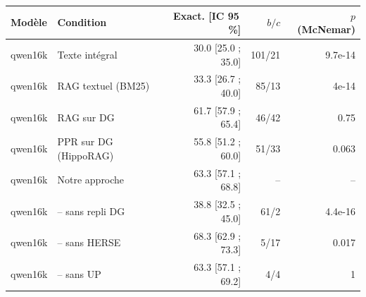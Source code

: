 \begin{tabular}{llrrr}
\hline
Modèle & Condition & Exact. [IC 95\,\%] & $b/c$ & $p$ (McNemar) \\
\hline
qwen16k & Texte intégral & 30.0 [25.0 ; 35.0] & 101/21 & 9.7e-14 \\
qwen16k & RAG textuel (BM25) & 33.3 [26.7 ; 40.0] & 85/13 & 4e-14 \\
qwen16k & RAG sur DG & 61.7 [57.9 ; 65.4] & 46/42 & 0.75 \\
qwen16k & PPR sur DG (HippoRAG) & 55.8 [51.2 ; 60.0] & 51/33 & 0.063 \\
qwen16k & Notre approche & 63.3 [57.1 ; 68.8] & -- & -- \\
qwen16k & -- sans repli DG & 38.8 [32.5 ; 45.0] & 61/2 & 4.4e-16 \\
qwen16k & -- sans HERSE & 68.3 [62.9 ; 73.3] & 5/17 & 0.017 \\
qwen16k & -- sans UP & 63.3 [57.1 ; 69.2] & 4/4 & 1 \\
\hline
\end{tabular}